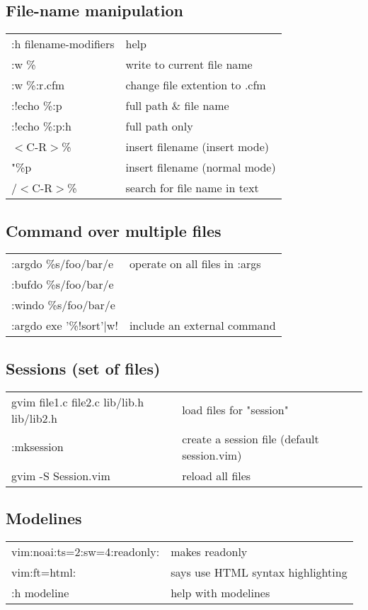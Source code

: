 \subsection{File-name manipulation}
\begin{center}
\begin{longtable}{l|l}
 :h filename-modifiers & help\\
 :w \% & write to current file name\\
 :w \%:r.cfm & change file extention to .cfm\\
 :!echo \%:p & full path \& file name\\
 :!echo \%:p:h & full path only\\
 $<$C-R$>$\% & insert filename (insert mode)\\
 "\%p & insert filename (normal mode)\\
 /$<$C-R$>$\% & search for file name in text
\end{longtable}
\end{center}

\subsection{Command over multiple files}
\begin{center}
\begin{longtable}{l|l}
 :argdo \%s/foo/bar/e & operate on all files in :args\\
 :bufdo \%s/foo/bar/e\\
 :windo \%s/foo/bar/e\\
 :argdo exe '\%!sort'$|$w! & include an external command
\end{longtable}
\end{center}

\subsection{Sessions (set of files)}
\begin{center}
\begin{longtable}{l|l}
 gvim file1.c file2.c lib/lib.h lib/lib2.h & load files for "session"\\
 :mksession & create a session file (default session.vim)\\
 gvim -S Session.vim & reload all files
\end{longtable}
\end{center}

\subsection{Modelines}
\begin{center}
\begin{longtable}{l|l}
 vim:noai:ts=2:sw=4:readonly: & makes readonly\\
 vim:ft=html: & says use HTML syntax highlighting\\
 :h modeline & help with modelines
\end{longtable}
\end{center}

